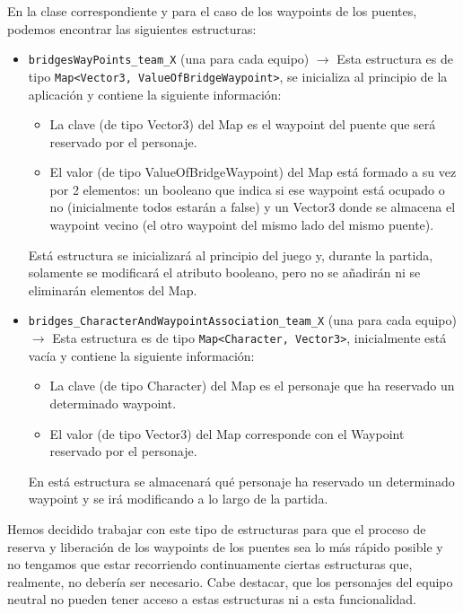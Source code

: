 En la clase correspondiente y para el caso de los waypoints de los puentes, podemos encontrar las siguientes estructuras:
\begin{itemize}
	\item \texttt{bridgesWayPoints\_team\_X} (una para cada equipo) $\rightarrow$ Esta estructura es de tipo \texttt{Map<Vector3, ValueOfBridgeWaypoint>}, se inicializa al principio de la aplicación y contiene la siguiente información:
		\begin{itemize}
			\item La clave (de tipo Vector3) del Map es el waypoint del puente que será reservado por el personaje.
			\item El valor (de tipo ValueOfBridgeWaypoint) del Map está formado a su vez por 2 elementos: un booleano que indica si ese waypoint está ocupado o no (inicialmente todos estarán a false) y un Vector3 donde se almacena el waypoint vecino (el otro waypoint del mismo lado del mismo puente).
		\end{itemize}
		Está estructura se inicializará al principio del juego y, durante la partida, solamente se modificará el atributo booleano, pero no se añadirán ni se eliminarán elementos del Map.
	\item \texttt{bridges\_CharacterAndWaypointAssociation\_team\_X} (una para cada equipo) $\rightarrow$ Esta estructura es de tipo \texttt{Map<Character, Vector3>}, inicialmente está vacía y contiene la siguiente información:
	\begin{itemize}
		\item La clave (de tipo Character) del Map es el personaje que ha reservado un determinado waypoint.
		\item El valor (de tipo Vector3) del Map corresponde con el Waypoint reservado por el personaje.
	\end{itemize}
	En está estructura se almacenará qué personaje ha reservado un determinado waypoint y se irá modificando a lo largo de la partida.
\end{itemize}

Hemos decidido trabajar con este tipo de estructuras para que el proceso de reserva y liberación de los waypoints de los puentes sea lo más rápido posible y no tengamos que estar recorriendo continuamente ciertas estructuras que, realmente, no debería ser necesario. Cabe destacar, que los personajes del equipo neutral no pueden tener acceso a estas estructuras ni a esta funcionalidad. \\

